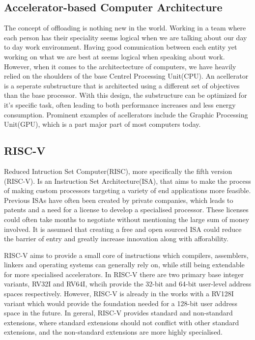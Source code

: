 
\subsection{Accelerator-based Computer Architecture}
The concept of offloading is nothing new in the world.
Working in a team where each person has their speciality seems logical when we are talking about our day to day work environment.
Having good comunication between each entity yet working on what we are best at seems logical when speaking about work. However,
when it comes to the architectecture of computers, we have heavily relied on the shoulders of the base Centrel Processing Unit(CPU).
An acellerator is a seperate substructure that is architected using a different set of objectives
than the base processor. With this design, the substructure can be optimized for it's specific task, often leading to both performance increases
and less energy consumption. \cite{AA} Prominent examples of acellerators include the Graphic Processing Unit(GPU), which is a part major part of most computers today.

\subsection{RISC-V}
Reduced Intruction Set Computer(RISC), more specifically the fifth version (RISC-V). Is an Instruction Set Architecture(ISA), that aims to make the process of
making custom processors targeting a variety of end applications more feasible. Previous ISAs have often been created by private companies, which leads to patents
and a need for a license to develop a specialised processor. These licenses could often take months to negotiate without mentioning the large sum of money involved.
It is assumed that creating a free and open sourced ISA could reduce the barrier of entry and greatly increase innovation along with afforability.\cite{ISAfree}

RISC-V aims to provide a small core of instructions which compilers, assemblers, linkers and operating systems can generally rely on, while still being extendable for more specialised
accelerators. In RISC-V there  are two primary base integer variants, RV32I and RV64I, whcih provide the 32-bit and 64-bit user-level address spaces respectively. However, RISC-V is already
in the works with a RV128I variant which would provide the foundation needed for a 128-bit user address space in the future. In gereral, RISC-V provides standard and non-standard extensions,
where standard extensions should not conflict with other standard extensions, and the non-standard extensions are more highly specialised.
